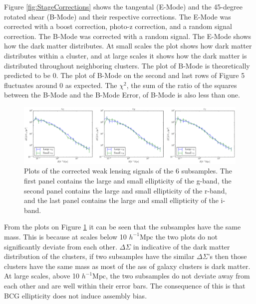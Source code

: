 \documentclass[iop]{emulateapj}
\begin{document}
Figure \ref{fig:StageCorrections} shows the tangental (E-Mode) and the 45-degree rotated shear (B-Mode) and their respective corrections. The E-Mode was corrected with a boost correction, photo-z correction, and a random signal correction. The B-Mode was corrected with a random signal. The E-Mode shows how the dark matter distributes. At small scales the plot shows how dark matter distributes within a cluster, and at large scales it shows how the dark matter is distributed throughout neighboring clusters. The plot of B-Mode is theoretically predicted to be 0. The plot of B-Mode on the second and last rows of Figure 5 fluctuates around 0 as expected. The $\chi^2$, the sum of the ratio of the squares between the B-Mode and the B-Mode Error, of B-Mode is also less than one.
	\begin{figure}[h]
		\includegraphics[width = \linewidth]{SixSubSamplePlotCorrectedEM}
		\caption{Plots of the corrected weak lensing signals of the 6 subsamples. The first panel contains the large and small ellipticity of the g-band, the second panel contains the large and small ellipticity of the r-band, and the last panel contains the large and small ellipticity of the i-band.}
		\label{fig:CorrectedSubsamplesWL}
	\end{figure}

From the plots on Figure \ref{fig:CorrectedSubsamplesWL} it can be seen that the subsamples have the same mass. This is because at scales below 10 $h^{-1} \mathrm{Mpc}$ the two plots do not significantly deviate from each other. $\Delta\Sigma$ in indicative of the dark matter distribution of the clusters, if two subsamples have the similar $\Delta\Sigma$'s then those clusters have the same mass as most of the ass of galaxy clusters is dark matter. At large scales, above 10 $h^{-1} \mathrm{Mpc}$, the two subsamples do not deviate away from each other and are well within their error bars. The consequence of this is that BCG ellipticity does not induce assembly bias.
\end{document}
